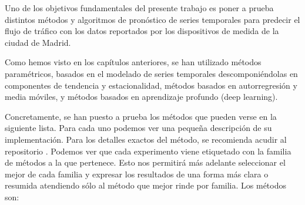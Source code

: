 \documentclass[]{book}
\begin{document}
Uno de los objetivos fundamentales del presente trabajo es poner a
prueba distintos métodos y algoritmos de pronóstico de series temporales
para predecir el flujo de tráfico con los datos reportados por los
dispositivos de medida de la ciudad de Madrid.

Como hemos visto en los capítulos anteriores, se han utilizado métodos
paramétricos, basados en el modelado de series temporales
descomponiéndolas en componentes de tendencia y estacionalidad, métodos
basados en autorregresión y media móviles, y métodos basados en
aprendizaje profundo (deep learning).

Concretamente, se han puesto a prueba los métodos que pueden verse en la
siguiente lista. Para cada uno podemos ver una pequeña descripción de su
implementación. Para los detalles exactos del método, se recomienda
acudir al repositorio \citep{amanas-github}. Podemos ver que cada
experimento viene etiquetado con la familia de métodos a la que
pertenece. Esto nos permitirá más adelante seleccionar el mejor de cada
familia y expresar los resultados de una forma más clara o resumida
atendiendo sólo al método que mejor rinde por familia. Los métodos son:
\end{document}
